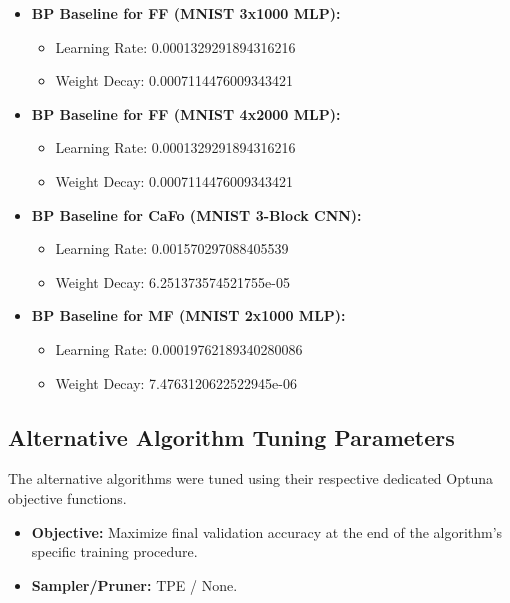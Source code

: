 \documentclass[11pt, english]{article}
\begin{document}
\begin{itemize}
            \begin{itemize}
                \item Learning Rate: 0.00010362161015212055
                \item Weight Decay: 9.105881789069153e-06
            \end{itemize}
    \item \textbf{BP Baseline for FF (MNIST 3x1000 MLP):}
        \begin{itemize}
            \item Learning Rate: 0.0001329291894316216
            \item Weight Decay: 0.0007114476009343421
        \end{itemize}
    \item \textbf{BP Baseline for FF (MNIST 4x2000 MLP):}
        \begin{itemize}
            \item Learning Rate: 0.0001329291894316216
            \item Weight Decay: 0.0007114476009343421
        \end{itemize}
    \item \textbf{BP Baseline for CaFo (MNIST 3-Block CNN):}
        \begin{itemize}
            \item Learning Rate: 0.001570297088405539
            \item Weight Decay: 6.251373574521755e-05
        \end{itemize}
    \item \textbf{BP Baseline for MF (MNIST 2x1000 MLP):}
        \begin{itemize}
            \item Learning Rate: 0.00019762189340280086
            \item Weight Decay: 7.4763120622522945e-06
        \end{itemize}
\end{itemize}

\subsection{Alternative Algorithm Tuning Parameters}
The alternative algorithms were tuned using their respective dedicated Optuna objective functions.
\begin{itemize}
    \item \textbf{Objective:} Maximize final validation accuracy at the end of the algorithm's specific training procedure.
    \item \textbf{Sampler/Pruner:} TPE / None.
\end{itemize}
\end{document}
